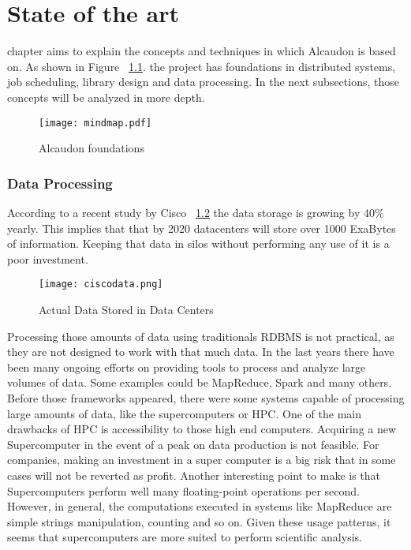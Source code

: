 \chapter{State of the art}
\label{chap:stateoftheart}

 chapter aims to explain the concepts and techniques in which
Alcaudon is based on. As shown in Figure ~\ref{fig:mindmap}. the project has foundations in
distributed systems, job scheduling, library design and data processing. In the
next subsections, those concepts will be analyzed in more depth.

\begin{figure}[!h]
\begin{center}
\texttt{[image: mindmap.pdf]}
\caption{Alcaudon foundations}
\label{fig:mindmap}
\end{center}
\end{figure}

\subsection{Data Processing}

According to a recent study by Cisco \cite{ciscosurvey}~\ref{fig:ciscodata} the
data storage is growing by 40\% yearly. This implies that that by 2020
datacenters will store over 1000 ExaBytes of information. Keeping that data in
silos without performing any use of it is a poor investment.

\begin{figure}[!h]
\begin{center}
\texttt{[image: ciscodata.png]}
\caption{Actual Data Stored in Data Centers\cite{ciscosurvey}}
\label{fig:ciscodata}
\end{center}
\end{figure}

Processing those amounts of data using traditionals RDBMS is not practical, as they
are not designed to work with that much data. In the last years there have been
many ongoing efforts on providing tools to process and analyze large volumes of
data. Some examples could be MapReduce\cite{mapreduce}, Spark\cite{spark} and
many others. Before those frameworks appeared, there were some systems capable
of processing large amounts of data, like the supercomputers or HPC. One of the
main drawbacks of HPC is accessibility to those high end computers. Acquiring a
new Supercomputer in the event of a peak on data production is not feasible. For
companies, making an investment in a super computer is a big risk that in some
cases will not be reverted as profit. Another interesting point to make is that
Supercomputers perform well many floating-point operations per second. However,
in general, the computations executed in systems like MapReduce are simple
strings manipulation, counting and so on. Given these usage patterns, it seems
that supercomputers are more suited to perform scientific analysis.

